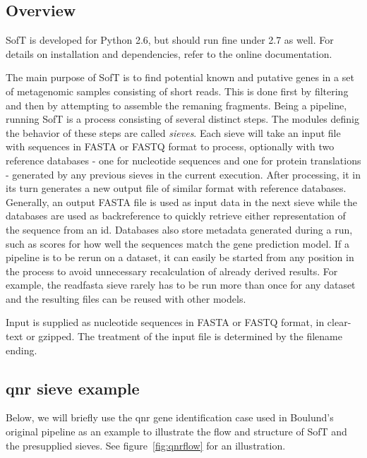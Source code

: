 \documentclass[a4paper,12pt]{article}
\begin{document}
\subsection{Overview}
SofT is developed for Python 2.6, but should run fine under 2.7 as well. For details on installation and dependencies, refer to the online documentation.

The main purpose of SofT is to find potential known and putative genes in a set of metagenomic samples consisting of short reads. This is done first by filtering and then by attempting to assemble the remaning fragments. Being a pipeline, running SofT is a process consisting of several distinct steps. The modules definig the behavior of these steps are called \emph{sieves}. Each sieve will take an input file with sequences in FASTA or FASTQ format to process, optionally with two reference databases - one for nucleotide sequences and one for protein translations - generated by any previous sieves in the current execution. After processing, it in its turn generates a new output file of similar format with reference databases. Generally, an output FASTA file is used as input data in the next sieve while the databases are used as backreference to quickly retrieve either representation of the sequence from an id. Databases also store metadata generated during a run, such as scores for how well the sequences match the gene prediction model. If a pipeline is to be rerun on a dataset, it can easily be started from any position in the process to avoid unnecessary recalculation of already derived results. For example, the readfasta sieve rarely has to be run more than once for any dataset and the resulting files can be reused with other models.

Input is supplied as nucleotide sequences in FASTA or FASTQ format, in clear-text or gzipped. The treatment of the input file is determined by the filename ending.

\subsection{qnr sieve example}
Below, we will briefly use the qnr gene identification case used in Boulund's original pipeline as an example to illustrate the flow and structure of SofT and the presupplied sieves. See figure~\ref{fig:qnrflow} for an illustration.
\end{document}
